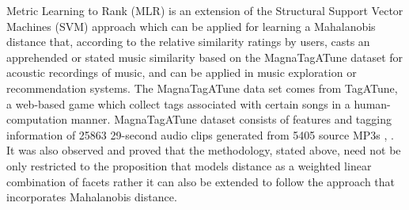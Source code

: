 \documentclass{proc}
\begin{document}
Metric Learning to Rank (MLR) is an extension of the Structural Support Vector Machines (SVM) approach which can be applied for learning a Mahalanobis distance that, according to the relative similarity ratings by users, casts an apprehended or stated music similarity based on the MagnaTagATune dataset for acoustic recordings of music, and can be applied in music exploration or recommendation systems. The MagnaTagATune data set comes from TagATune, a web-based game which collect tags associated with certain songs in a human-computation manner. MagnaTagATune dataset consists of features and tagging information of 25863 29-second audio clips generated from 5405 source MP3s \cite{Stober},  \cite{Detyniecki2013} . It was also observed and proved that the methodology, stated above, need not be only restricted to the proposition that models distance as a weighted linear combination of facets rather it can also be extended to follow the approach that incorporates Mahalanobis distance. \par
\end{document}
